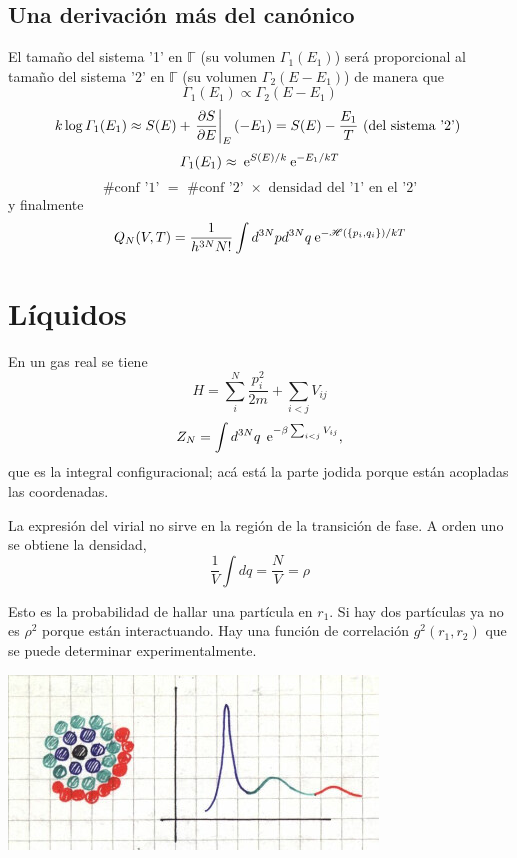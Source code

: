 \documentclass[10pt,oneside]{CBFT_book}
\begin{document}
\subsection{Una derivación más del canónico}

El tamaño del sistema '1' en $\mathbb{\Gamma}$ (su volumen $\Gamma_1(E_1)$) será proporcional al tamaño del sistema 
'2' en $\mathbb{\Gamma}$ (su volumen $\Gamma_2(E-E_1)$) de manera que 
\[
	\Gamma_1(E_1) \propto \Gamma_2(E-E_1)
\]
\[
	k\log \Gamma_1(E_1) \approx S(E) + \left.\frac{\partial^{\hspace{-0.05em}} {S}}{\partial {E}^{\hspace{-0.05em}}}\right|_E (-E_1) = S(E) - \frac{E_1}{T} 
	\text{ (del sistema '2') }
\]
\[
	\Gamma_1(E_1) \approx \:\mathrm{e}^{S(E)/k} \:\mathrm{e}^{-E_1/kT} 
\]
\[
	\text{ \# conf '1' } = \text{ \# conf '2' } \times \text{ densidad del '1' en el '2' }
\]
y finalmente
\[
	Q_N (V,T) = \frac{1}{h^{3N}N!} \int d^{3N}p d^{3N}q \:\mathrm{e}^{-\mathscr{H}(\{ p_i,q_i\})/kT}
\]

\section{Líquidos}

En un gas real se tiene
\[
	H = \sum_i^N \frac{p_i^2}{2m} + \sum_{i<j} V_{ij}
\]
\[
	Z_N = \int d^{3N}q \: \:\mathrm{e}^{ - \beta \sum_{i<j} V_{ij} },
\]
que es la integral configuracional; acá está la parte jodida porque están acopladas las coordenadas.

La expresión del virial no sirve en la región de la transición de fase.
A orden uno se obtiene la densidad,
\[
	\frac{1}{V} \int dq = \frac{N}{V} = \rho 
\]

Esto es la probabilidad de hallar una partícula en $r_1$. Si hay dos partículas ya no es $\rho^2$ porque
están interactuando. Hay una función de correlación $g^2(r_1,r_2)$ que se puede determinar experimentalmente.


\includegraphics[scale=0.5]{images/1606329384.jpg} 
\end{document}
